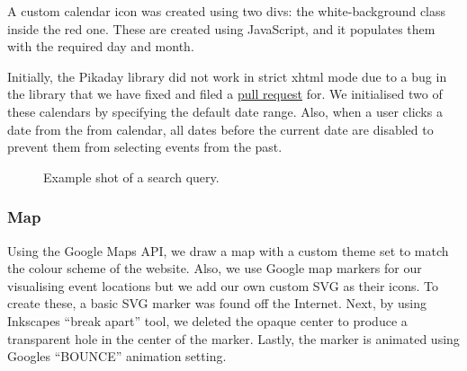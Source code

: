 \documentclass[10pt]{article}
\begin{document}
                A custom calendar icon was created using two divs: the white-background class inside the red one. These are created using JavaScript, and it populates them with the required day and month.


                Initially, the Pikaday library did not work in strict xhtml mode due to a bug in the library that we have fixed and filed a \href{https://github.com/dbushell/Pikaday/pull/526}{pull request} for. We initialised two of these calendars by specifying the default date range. Also, when a user clicks a date from the from calendar, all dates before the current date are disabled to prevent them from selecting events from the past.

                \begin{figure}[!ht]
                  \centering
                  \caption{Example shot of a search query.}
                \end{figure}



            \subsubsection{Map}
                Using the Google Maps API, we draw a map with a custom theme set to match the colour scheme of the  website. Also, we use Google map markers for our visualising event locations but we add our own custom SVG as their icons. To create these, a basic SVG marker was found off the Internet. Next, by using Inkscape\textquotesingle s ``break apart'' tool, we deleted the opaque center to produce a transparent hole in the center of the marker. Lastly, the  marker is animated using Google\textquotesingle s ``BOUNCE'' animation setting.
\end{document}
